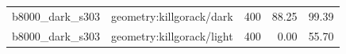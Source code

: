 \begin{longtable}{l>{\raggedright\arraybackslash}p{.42\linewidth}rrr}
b8000\_\allowbreak{}dark\_\allowbreak{}s303 & %
geometry:killgorack/dark & %
400 & %
88.25 & %
99.39 \\ %

b8000\_\allowbreak{}dark\_\allowbreak{}s303 & %
geometry:killgorack/light & %
400 & %
0.00 & %
55.70 \\ %


\end{longtable}
